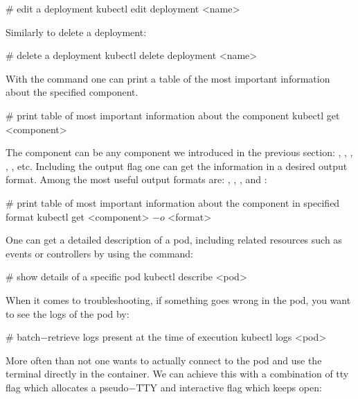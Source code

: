 \begin{bash}
# edit a deployment
kubectl edit deployment <name>
\end{bash}

Similarly to delete a deployment:

\begin{bash}
# delete a deployment
kubectl delete deployment <name>
\end{bash}

With the  command one can print a table of the most important information about the specified
component.

\begin{bash}
# print table of most important information about the component
kubectl get <component>
\end{bash}

The component can be any component we introduced in the previous section: , , ,
, , etc. Including the output flag  one can get the information in a
desired output format. Among the most useful output formats are: , , ,
 and :

\begin{bash}
# print table of most important information about the component in specified format
kubectl get <component> $-o$ <format>
\end{bash}

One can get a detailed description of a pod, including related resources such as events or controllers by using the
 command:

\begin{bash}
# show details of a specific pod
kubectl describe <pod>
\end{bash}

When it comes to troubleshooting, if something goes wrong in the pod, you want to see the logs of the pod by:

\begin{bash}
# batch$-$retrieve logs present at the time of execution
kubectl logs <pod>
\end{bash}

More often than not one wants to actually connect to the pod and use the terminal directly in the container. We can
achieve this with a combination of tty  flag which allocates a pseudo$-$TTY and interactive 
flag which keeps  open:

